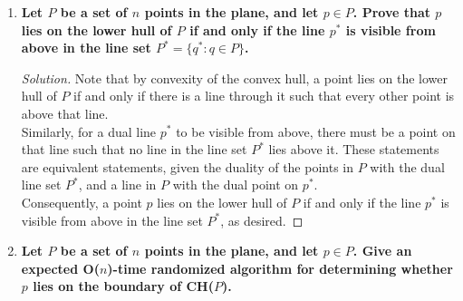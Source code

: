 \documentclass[11pt]{article}
\newenvironment{solution}
  {\renewcommand\qedsymbol{$\blacksquare$}\begin{proof}[Solution]}
  {\end{proof}}
\begin{document}
\begin{enumerate}
\begin{solution}
\end{solution}

\newpage 

\item\textbf{Let $P$ be a set of $n$ points in the plane, and let $p\in P$. Prove that $p$ lies on the lower hull of $P$ if and only if the line $p^*$ is visible from above in the line set $P^* = \{q^*: q \in P\}$.}

\begin{solution}

Note that by convexity of the convex hull, a point lies on the lower hull of $P$ if and only if there is a line through it such that every other point is above that line. \\

Similarly, for a dual line $p^*$ to be visible from above, there must be a point on that line such that no line in the line set $P^*$ lies above it. These statements are equivalent statements, given the duality of the points in $P$ with the dual line set $P^*$, and a line in $P$ with the dual point on $p^*$. \\

Consequently, a point $p$ lies on the lower hull of $P$ if and only if the line $p^*$ is visible from above in the line set $P^*$, as desired.\end{solution}


\newpage

\item\textbf{Let $P$ be a set of $n$ points in the plane, and let $p \in P$. Give an expected O($n$)-time randomized algorithm for determining whether $p$ lies on the boundary of CH($P$).}


\end{enumerate}
\end{document}
